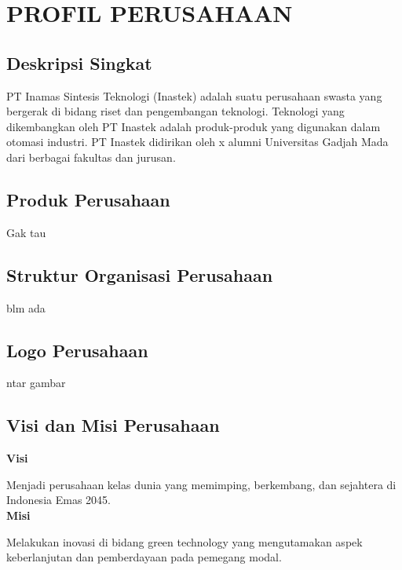 
\chapter{PROFIL PERUSAHAAN}                

\section{Deskripsi Singkat}
PT Inamas Sintesis Teknologi (Inastek) adalah suatu perusahaan swasta yang bergerak di bidang riset dan pengembangan teknologi. Teknologi yang dikembangkan oleh PT Inastek adalah produk-produk yang digunakan dalam otomasi industri. PT Inastek didirikan oleh x alumni Universitas Gadjah Mada dari berbagai fakultas dan jurusan.

\section{Produk Perusahaan}
Gak tau

\section{Struktur Organisasi Perusahaan}
blm ada

\section{Logo Perusahaan}
ntar gambar

\section{Visi dan Misi Perusahaan}
\noindent
\textbf{Visi}

Menjadi perusahaan kelas dunia yang memimping, berkembang, dan sejahtera di Indonesia Emas 2045.\\

\noindent
\textbf{Misi}

Melakukan inovasi di bidang green technology yang mengutamakan aspek keberlanjutan dan pemberdayaan pada pemegang modal.\\

\begin{comment}

\end{comment}
